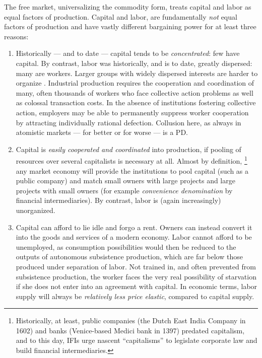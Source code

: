 The free market, universalizing the commodity form, treats capital and labor as equal factors of production.
Capital and labor, are fundamentally \emph{not} equal factors of production and have vastly different bargaining power for at least three reasons:

\begin{enumerate}
	\item Historically --- and to date --- capital tends to be \emph{concentrated}:
	few have capital.
	By contrast, labor was historically, and is to date, greatly dispersed:
	many are workers.
	Larger groups with widely dispersed interests are harder to organize \citep{Olson-1971-aa}.
	Industrial production requires the cooperation and coordination of many, often thousands of workers who face collective action problems as well as colossal transaction costs.
	In the absence of institutions fostering collective action, employers may be able to permanently suppress worker cooperation by attracting individually rational defection.
	Collusion here, as always in atomistic markets --- for better or for worse --- is a \gls{PD}.

	\item Capital is \emph{easily cooperated and coordinated} into production, if pooling of resources over several capitalists is necessary at all.
	Almost by definition,
	\footnote{
		Historically, at least, public companies (the Dutch East India Company in 1602) and banks (Venice-based Medici bank in 1397) predated capitalism, and to this day, \glspl{IFI} urge nascent ``capitalisms'' to legislate corporate law and build financial intermediaries.
	}
	any market economy will provide the institutions to pool capital (such as a public company) and match small owners with large projects and large projects with small owners (for example  \emph{convenience denomination} by financial intermediaries).
	By contrast, labor is (again increasingly) unorganized.

	\item Capital can afford to lie idle and forgo a rent.
	Owners can instead convert it into the goods and services of a modern economy.
	Labor cannot afford to be unemployed, as consumption possibilities would then be reduced to the outputs of autonomous subsistence production, which are far below those produced under separation of labor.
	Not trained in, and often prevented from subsistence production, the worker faces the very real possibility of starvation if she does not enter into an agreement with capital.
	In economic terms, labor supply will always be \emph{relatively less price elastic}, compared to capital supply.
\end{enumerate}

